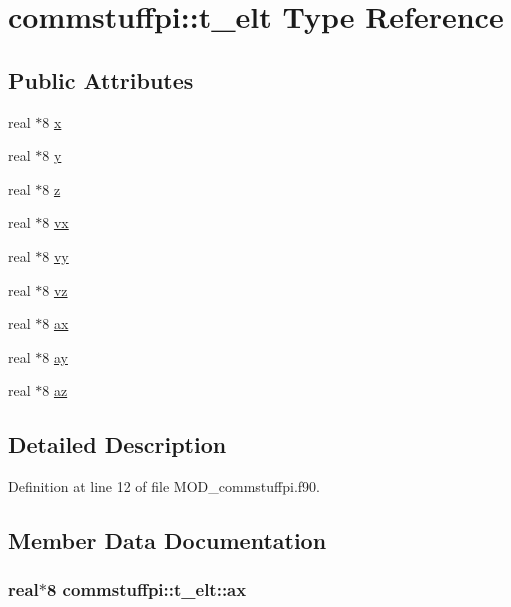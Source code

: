 \hypertarget{structcommstuffpi_1_1t__elt}{\section{commstuffpi\-:\-:t\-\_\-elt Type Reference}
\label{structcommstuffpi_1_1t__elt}
}
\subsection*{Public Attributes}
\begin{DoxyCompactItemize}
\item 
real $\ast$8 \hyperlink{structcommstuffpi_1_1t__elt_a7627598a90642e382cb3dbb171ad2e3f}{x}
\item 
real $\ast$8 \hyperlink{structcommstuffpi_1_1t__elt_ae972f0b43913b25386b9be4ed3ffcdd2}{y}
\item 
real $\ast$8 \hyperlink{structcommstuffpi_1_1t__elt_a46dd7cde4e37ed151ca268e9e9ad2d8b}{z}
\item 
real $\ast$8 \hyperlink{structcommstuffpi_1_1t__elt_aa3bc3c136824f88e8b634a100bcc8eb9}{vx}
\item 
real $\ast$8 \hyperlink{structcommstuffpi_1_1t__elt_a71f01c1567b725ff07ad9afb1d30c841}{vy}
\item 
real $\ast$8 \hyperlink{structcommstuffpi_1_1t__elt_a01a290f6f9c6d8220904d44b2376e7cd}{vz}
\item 
real $\ast$8 \hyperlink{structcommstuffpi_1_1t__elt_ac49a8a8e892f9abb63a942d7c0b629f2}{ax}
\item 
real $\ast$8 \hyperlink{structcommstuffpi_1_1t__elt_a78bb0b88c673ccd83ce03bdbc0dc82d2}{ay}
\item 
real $\ast$8 \hyperlink{structcommstuffpi_1_1t__elt_a2c89f582baf5f9c949e2ab220841ab39}{az}
\end{DoxyCompactItemize}


\subsection{Detailed Description}


Definition at line 12 of file M\-O\-D\-\_\-commstuffpi.\-f90.



\subsection{Member Data Documentation}
\hypertarget{structcommstuffpi_1_1t__elt_ac49a8a8e892f9abb63a942d7c0b629f2}{
\subsubsection[{ax}]{\setlength{\rightskip}{0pt plus 5cm}real$\ast$8 commstuffpi\-::t\-\_\-elt\-::ax}}\label{structcommstuffpi_1_1t__elt_ac49a8a8e892f9abb63a942d7c0b629f2}


